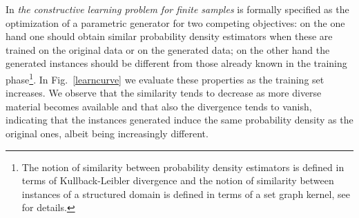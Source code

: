 \documentclass[a4paper]{esannV2}
\begin{document}
In \cite{costa16}  \emph{the constructive learning problem for finite
samples} is formally specified as the optimization of a parametric generator
for two competing objectives: on the one hand one should obtain similar
probability density estimators when these are trained on the original data or
on the generated data; on the other hand the generated instances should be
different from those already known in the training phase\footnote{The notion
of similarity between probability density estimators is defined in terms of
Kullback-Leibler divergence and the notion of similarity between instances of
a structured domain is defined in terms of a set graph kernel, see
\citep{costa16} for details.}. In Fig.~\ref{learncurve} we evaluate these
properties as the training set increases. We observe that the similarity tends
to decrease as more diverse material becomes available and that also the
divergence tends to vanish, indicating that the instances generated induce the
same probability density as the original ones, albeit being increasingly
different.
\end{document}
